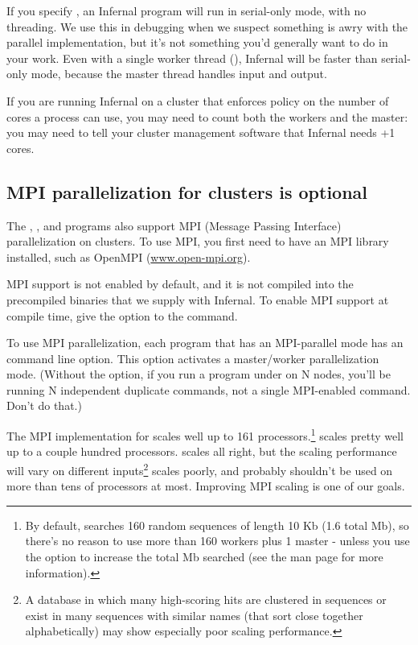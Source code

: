 If you specify , an Infernal program will run in
serial-only mode, with no threading. We use this in debugging when we
suspect something is awry with the parallel implementation, but it's
not something you'd generally want to do in your work.  Even with a
single worker thread (), Infernal will be faster than
serial-only mode, because the master thread handles input and output.

If you are running Infernal on a cluster that enforces policy on the
number of cores a process can use, you may need to count both the
workers and the master: you may need to tell your cluster management
software that Infernal needs +1 cores.

\subsection{MPI parallelization for clusters is optional}

The , ,  and
 programs also support MPI (Message Passing Interface)
parallelization on clusters.  To use MPI, you first need to have an
MPI library installed, such as OpenMPI (\url{www.open-mpi.org}). 

MPI support is not enabled by default, and it is not compiled into the
precompiled binaries that we supply with Infernal. To enable MPI support
at compile time, give the  option to the
 command.

To use MPI parallelization, each program that has an MPI-parallel mode
has an  command line option. This option activates a
master/worker parallelization mode. (Without the  option,
if you run a program under  on N nodes, you'll be
running N independent duplicate commands, not a single MPI-enabled
command. Don't do that.)

The MPI implementation for  scales well up to 161
processors.\footnote{By default,  searches 160
random sequences of length 10 Kb (1.6 total Mb), so there's no reason
to use more than 160 workers plus 1 master - unless you use the
 option to increase the total Mb searched (see the
 man page for more information).} 
scales pretty well up to a couple hundred processors. 
scales all right, but the scaling performance will vary on different
inputs\footnote{A database in which many high-scoring hits are
  clustered in sequences or exist in many sequences with similar names
  (that sort close together alphabetically) may show especially poor
  scaling performance.}  scales poorly, and probably
shouldn't be used on more than tens of processors at most. Improving
MPI scaling is one of our goals.

